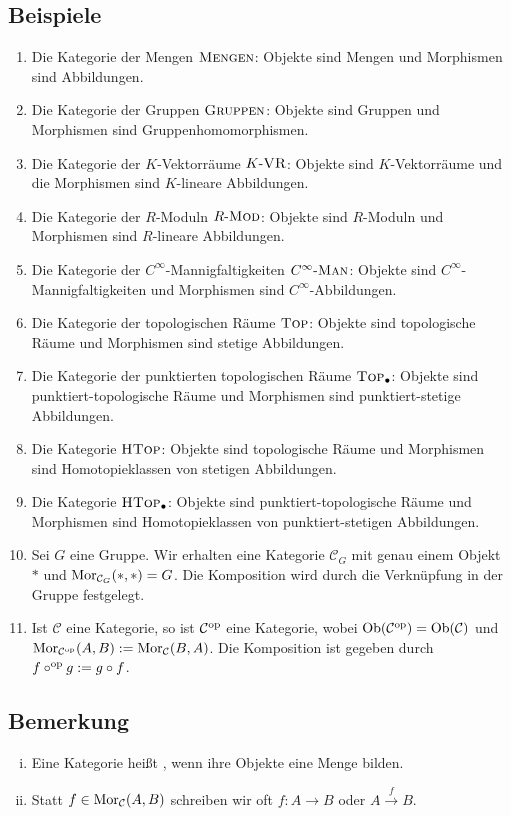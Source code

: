 \subsection[Beispiele für Kategorien]{Beispiele} %
\label{sub:12}
\begin{enumerate}[(1)]
	\item Die Kategorie der Mengen $\textsc{Mengen}$: Objekte sind Mengen und Morphismen sind Abbildungen.
	\item Die Kategorie der Gruppen $\textsc{Gruppen}$: Objekte sind Gruppen und Morphismen sind Gruppenhomomorphismen.
	\item Die Kategorie der $K$-Vektorräume $K\text{-}\textsc{VR}$: Objekte sind $K$-Vektorräume und die Morphismen sind $K$-lineare Abbildungen.
	\item Die Kategorie der $R$-Moduln $R\text{-}\textsc{Mod}$: Objekte sind $R$-Moduln und Morphismen sind $R$-lineare Abbildungen.
	\item Die Kategorie der $C^\infty$-Mannigfaltigkeiten $C^\infty\text{-}\textsc{Man}$: Objekte sind $C^\infty$-Mannigfaltigkeiten und Morphismen sind $C^\infty$-Abbildungen.
	\item Die Kategorie der topologischen Räume $\textsc{Top}$: Objekte sind topologische Räume und Morphismen sind stetige Abbildungen.
	\item Die Kategorie der punktierten topologischen Räume $\textsc{Top}_\bullet$: Objekte sind punktiert-topologische Räume und Morphismen sind punktiert-stetige Abbildungen.
	\item Die Kategorie $\textsc{HTop}$: Objekte sind topologische Räume und Morphismen sind Homotopieklassen von stetigen Abbildungen.
	\item Die Kategorie $\textsc{HTop}_\bullet$: Objekte sind punktiert-topologische Räume und Morphismen sind Homotopieklassen von punktiert-stetigen Abbildungen.
	\item Sei $G$ eine Gruppe. Wir erhalten eine Kategorie $\mathcal{C}_G$ mit genau einem Objekt $*$ und $\operatorname{Mor}_{\mathcal{C}_G}(*,*) = G$. Die Komposition wird durch die
	Verknüpfung in der Gruppe festgelegt.
	\item Ist $\mathcal{C}$ eine Kategorie, so ist $\mathcal{C}^{\mathrm{op}}$ eine Kategorie, wobei $\operatorname{Ob}(\mathcal{C}^{\mathrm{op}}) = \operatorname{Ob}(\mathcal{C})$ und 
	\(
		\operatorname{Mor}_{\mathcal{C}^{\mathrm{op}}}(A,B) := \operatorname{Mor}_\mathcal{C}(B,A)
	\).
	Die Komposition ist gegeben durch $f \circ^{\mathrm{op}} g := g \circ f$.
\end{enumerate}

\subsection[Bemerkungen zu Kategorien]{Bemerkung} %
\label{sub:13}
\begin{enumerate}[(i)]
	\item Eine Kategorie heißt , wenn ihre Objekte eine Menge bilden.
	\item Statt $f \in \operatorname{Mor}_\mathcal{C}(A,B)$ schreiben wir oft $f \colon A \to B$ oder $A \xrightarrow{f} B$.
\end{enumerate}

